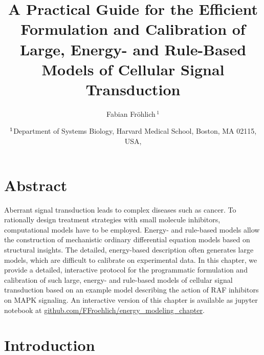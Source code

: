\documentclass[11pt]{article}
\title{A Practical Guide for the Efficient Formulation and Calibration
of Large, Energy- and Rule-Based Models of Cellular Signal
Transduction}
\author{
Fabian Fr\"ohlich\,$^{\text{1}}$
}
\date{%
$^{\text{\sf 1}}$Department of Systems Biology, Harvard Medical School, Boston, MA 02115, USA,\\
}
\begin{document}
    
    \maketitle
    
    

    \hypertarget{abstract}{%
\section*{Abstract}\label{abstract}}

    Aberrant signal transduction leads to complex diseases such as cancer.
To rationally design treatment strategies with small molecule
inhibitors, computational models have to be employed. Energy- and
rule-based models allow the construction of mechanistic ordinary
differential equation models based on structural insights. The detailed,
energy-based description often generates large models, which are
difficult to calibrate on experimental data. In this chapter, we provide
a detailed, interactive protocol for the programmatic formulation and
calibration of such large, energy- and rule-based models of cellular
signal transduction based on an example model describing the action of
RAF inhibitors on MAPK signaling. An interactive version of this chapter
is available as jupyter notebook at
\href{https:://github.com/FFroehlich/energy_modeling_chapter}{github.com/FFroehlich/energy\_modeling\_chapter}.

    \hypertarget{introduction}{%
\section{Introduction}\label{introduction}}
\end{document}
